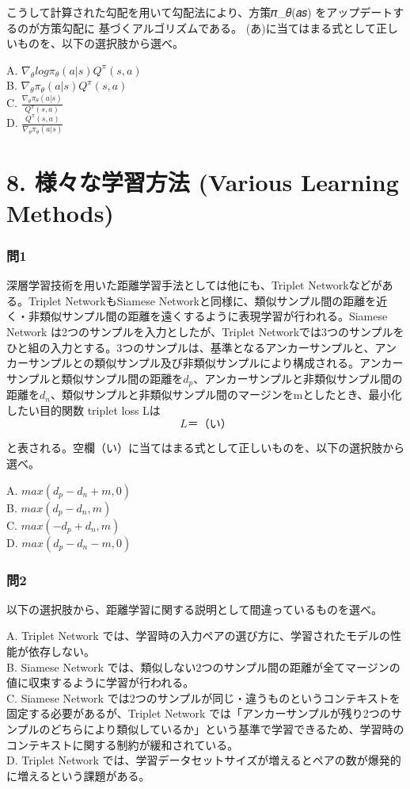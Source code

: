 \documentclass[
  letterpaper,
  DIV=11,
  numbers=noendperiod]{scrreprt}
\begin{document}
こうして計算された勾配を用いて勾配法により、方策𝜋\_𝜃(𝑎\textbar 𝑠)
をアップデートするのが方策勾配に 基づくアルゴリズムである。
(あ)に当てはまる式として正しいものを、以下の選択肢から選べ。

A. \(∇_𝜃log𝜋_𝜃(𝑎|𝑠)𝑄^𝜋(𝑠,𝑎)\)\\
B. \(∇_𝜃𝜋_𝜃(𝑎|𝑠)𝑄^𝜋(𝑠,𝑎)\)\\
C. \(\frac{∇_𝜃𝜋_𝜃(𝑎|𝑠)}{𝑄^𝜋(𝑠,𝑎)}\)\\
D. \(\frac{𝑄^𝜋(𝑠,𝑎)}{∇_𝜃𝜋_𝜃(𝑎|𝑠)}\)

\chapter{8. 様々な学習方法 (Various Learning
Methods)}\label{ux69d8ux3005ux306aux5b66ux7fd2ux65b9ux6cd5-various-learning-methods}

\subsection{問1}\label{ux554f1-6}

深層学習技術を用いた距離学習手法としては他にも、Triplet
Networkなどがある。Triplet NetworkもSiamese
Networkと同様に、類似サンプル間の距離を近く・非類似サンプル間の距離を遠くするように表現学習が行われる。Siamese
Network は2つのサンプルを入力としたが、Triplet
Networkでは3つのサンプルをひと組の入力とする。3つのサンプルは、基準となるアンカーサンプルと、アンカーサンプルとの類似サンプル及び非類似サンプルにより構成される。アンカーサンプルと類似サンプル間の距離を\({d_p}\)、アンカーサンプルと非類似サンプル間の距離を\({d_n}\)、類似サンプルと非類似サンプル間のマージンをmとしたとき、最小化したい目的関数
triplet loss Lは \[
L ＝（い）
\]

と表される。空欄（い）に当てはまる式として正しいものを、以下の選択肢から選べ。

A. \({max(d_p - d_n + m, 0)}\)\\
B. \({max(d_p - d_n, m)}\)\\
C. \({max(-d_p + d_n, m)}\)\\
D. \({max(d_p - d_n - m, 0)}\)

\subsection{問2}\label{ux554f2-4}

以下の選択肢から、距離学習に関する説明として間違っているものを選べ。

A. Triplet Network
では、学習時の入力ペアの選び方に、学習されたモデルの性能が依存しない。\\
B. Siamese Network
では、類似しない2つのサンプル間の距離が全てマージンの値に収束するように学習が行われる。\\
C. Siamese Network
では2つのサンプルが同じ・違うものというコンテキストを固定する必要があるが、Triplet
Network
では「アンカーサンプルが残り2つのサンプルのどちらにより類似しているか」という基準で学習できるため、学習時のコンテキストに関する制約が緩和されている。\\
D. Triplet Network
では、学習データセットサイズが増えるとペアの数が爆発的に増えるという課題がある。
\end{document}
